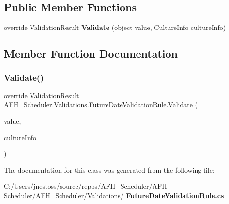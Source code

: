 \subsection*{Public Member Functions}
\begin{DoxyCompactItemize}
\item 
override Validation\+Result \textbf{ Validate} (object value, Culture\+Info culture\+Info)
\end{DoxyCompactItemize}


\subsection{Member Function Documentation}
\mbox{\label{class_a_f_h___scheduler_1_1_validations_1_1_future_date_validation_rule_acd5e2d4d219317c88b1c813de666dfe4}} 
\subsubsection{Validate()}
{\footnotesize\ttfamily override Validation\+Result A\+F\+H\+\_\+\+Scheduler.\+Validations.\+Future\+Date\+Validation\+Rule.\+Validate (\begin{DoxyParamCaption}\item[{object}]{value,  }\item[{Culture\+Info}]{culture\+Info }\end{DoxyParamCaption})}



The documentation for this class was generated from the following file\+:\begin{DoxyCompactItemize}
\item 
C\+:/\+Users/jnestoss/source/repos/\+A\+F\+H\+\_\+\+Scheduler/\+A\+F\+H-\/\+Scheduler/\+A\+F\+H\+\_\+\+Scheduler/\+Validations/\textbf{ Future\+Date\+Validation\+Rule.\+cs}\end{DoxyCompactItemize}

